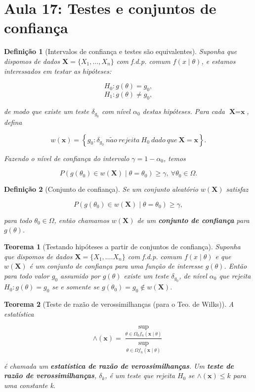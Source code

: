\documentclass{article}
\newtheorem{theorem}{Teorema}
\newtheorem{definition}{Definição}
\begin{document}
\section*{Aula 17: Testes e conjuntos de confiança}
\label{s17}
\begin{definition}[Intervalos de confiança e testes são equivalentes]

Suponha que dispomos de dados $\textbf{X} = \{ X_1, \ldots, X_n \}$ com f.d.p. comum $f(x \mid \theta)$, e estamos interessados em testar as hipóteses:

$$H_0 : g(\theta) = g_0,$$
$$H_1 : g(\theta) \neq g_0,$$

de modo que existe um teste $\delta_{g_0}$ com nível $\alpha_0$ destas hipóteses. Para cada $\textbf{X} = \textbf{x}$, defina

$$w(\textbf{x}) = \left\{g_0: \delta_{g_0} \:n\tilde{a}o\:rejeita\: H_0 \:dado\:que\: \textbf{X} = \textbf{x} \right\}.$$

Fazendo o nível de confiança do intervalo $\gamma = 1 - \alpha_0$, temos

$$P(g(\theta_0) \in w(\textbf{X}) \mid \theta = \theta_0) \geq \gamma, \ \forall \theta_0 \in \Omega.$$
\end{definition}

\begin{definition}[Conjunto de confiança]
Se um conjunto aleatório $w(\textbf{X})$ satisfaz

$$P(g(\theta_0) \in w(\textbf{X}) \mid \theta = \theta_0) \geq \gamma,$$

para todo $\theta_0 \in \Omega$, então chamamos $w(\textbf{X})$ de um \textbf{conjunto de confiança} para $g(\theta)$.
\end{definition}

\begin{theorem}[Testando hipóteses a partir de conjuntos de confiança]
Suponha que dispomos de dados $\textbf{X} = \{ X_1, \ldots. X_n \}$ com f.d.p. comum $f(x \mid \theta)$ e que $w(\textbf{X})$ é um conjunto de confiança para uma função de interesse $g(\theta)$. Então para todo valor $g_0$ assumido por $g(\theta)$ existe um teste $\delta_{g_0}$, de nível $\alpha_0$ que rejeita $H_0 : g(\theta) = g_0$ se e somente se $g(\theta_0) = g_0 \notin w(\textbf{X})$.
\end{theorem}

\begin{theorem}[Teste de razão de verossimilhanças (para o Teo. de Wilks)]
A estatística

$$\wedge(\textbf{x}) = \frac{\sup_{\theta \in \Omega_0 f_n (\textbf{x} \mid \theta)}}{\sup_{\theta \in \Omega f_n (\textbf{x} \mid \theta)}}$$

é chamada um \textbf{estatística de razão de verossimilhanças}. Um \textbf{teste de razão de verossimilhanças}, $\delta_k$, é um teste que rejeita $H_0$ se $\wedge(\textbf{x}) \leq k$ para uma constante k.
\end{theorem}
\end{document}
